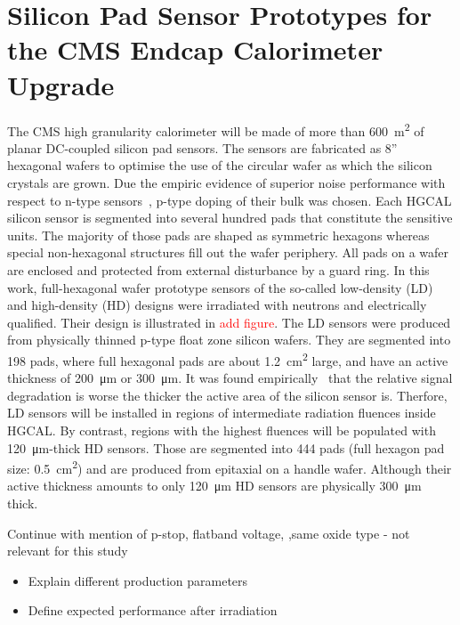 \section{Silicon Pad Sensor Prototypes for the CMS Endcap Calorimeter Upgrade}
\label{sec:sensors}

The CMS high granularity calorimeter will be made of more than \SI{600}{\metre\squared} of planar DC-coupled silicon pad sensors.
The sensors are fabricated as 8'' hexagonal wafers to optimise the use of the circular wafer as which the silicon crystals are grown.
Due the empiric evidence of superior noise performance with respect to n-type sensors~\cite{Adam_2017}, p-type doping of their bulk was chosen.
Each HGCAL silicon sensor is segmented into several hundred pads that constitute the sensitive units. 
The majority of those pads are shaped as symmetric hexagons whereas special non-hexagonal structures fill out the wafer periphery.
All pads on a wafer are enclosed and protected from external disturbance by a guard ring.\newline
In this work, full-hexagonal wafer prototype sensors of the so-called low-density (LD) and high-density (HD) designs were irradiated with neutrons and electrically qualified.
Their design is illustrated in \textcolor{red}{add figure}.
The LD sensors were produced from physically thinned p-type float zone silicon wafers.
They are segmented into 198 pads, where full hexagonal pads are about \SI{1.2}{\centi\metre\squared} large, and have an active thickness of \SI{200}{\micro\meter} or \SI{300}{\micro\meter}.
It was found empirically~\cite{hgcal-tdr:2018} that the relative signal degradation is worse the thicker the active area of the silicon sensor is.
Therfore, LD sensors will be installed in regions of intermediate radiation fluences inside HGCAL.
By contrast, regions with the highest fluences will be populated with \SI{120}{\micro\meter}-thick HD sensors.
Those are segmented into 444 pads (full hexagon pad size: \SI{0.5}{\centi\metre\squared}) and are produced from epitaxial on a handle wafer.
Although their active thickness amounts to only \SI{120}{\micro\meter} HD sensors are physically \SI{300}{\micro\metre} thick.\newline

Continue with mention of p-stop, flatband voltage, ,same oxide type - not relevant for this study

\begin{itemize}
    \item Explain different production parameters
    \item Define expected performance after irradiation
\end{itemize}
